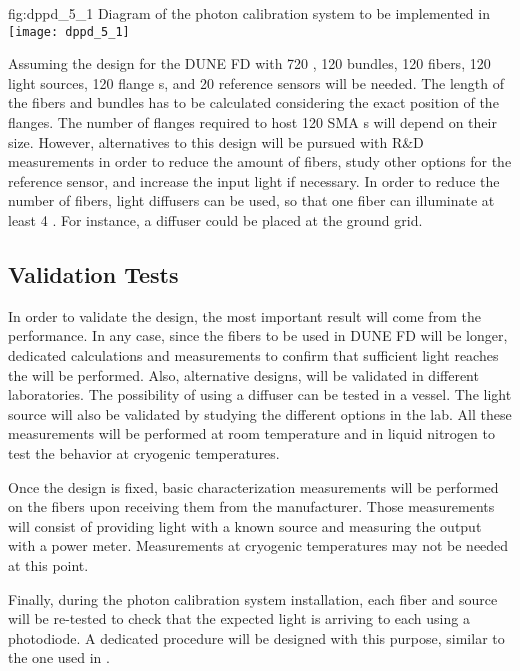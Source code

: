 \begin{dunefigure}{fig:dppd_5_1}
{Diagram of the photon calibration system to be implemented in }
\texttt{[image: dppd\_5\_1]}
\end{dunefigure}

Assuming the  design for the DUNE FD with \num{720} , \num{120} bundles, \num{120} fibers, \num{120} light sources, \num{120} flange \fdth{}s, and \num{20} reference sensors will be needed. The length of the fibers and bundles has to be calculated considering the exact position of the \fdth flanges. The number of flanges required to host \num{120} SMA \fdth{}s will depend on their size. However, alternatives to this design will be pursued with R\&D measurements in order to reduce the amount of fibers, study other options for the reference sensor, and increase the input light if necessary. In order to reduce the number of fibers, light diffusers can be used, so that one fiber can illuminate at least \num{4} . For instance, a diffuser could be placed at the ground grid. 

\subsection{Validation Tests}
\label{sec:fddp-pd-5.2}

In order to validate the design, the most important result will come from the  performance. In any case, since the fibers to be used in DUNE FD will be longer, dedicated calculations and measurements to confirm that sufficient light reaches the  will be performed. Also, alternative designs, will be validated in different laboratories. The possibility of using a diffuser can be tested in a vessel. The light source will also be validated by studying the different options in the lab. All these measurements will be performed at room temperature and in liquid nitrogen to test the behavior at cryogenic temperatures.

Once the design is fixed, basic characterization measurements will be performed on the fibers upon receiving them from the manufacturer. Those measurements will consist of providing light with a known source and measuring the output with a power meter. Measurements at cryogenic temperatures may not be needed at this point.

Finally, during the photon calibration system installation, each fiber and source will be re-tested to check that the expected light is arriving to each  using a photodiode. A dedicated procedure will be designed with this purpose, similar to the one used in .

